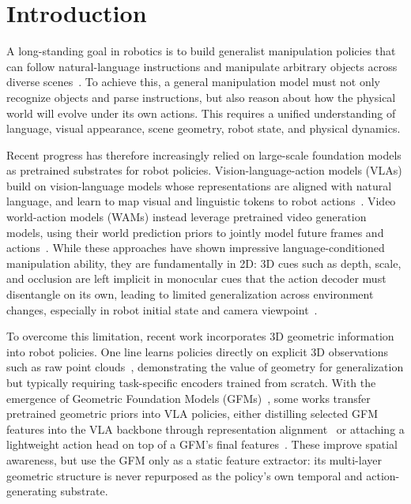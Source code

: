 \section{Introduction}
\label{sec:intro}
A long-standing goal in robotics is to build generalist manipulation policies that can follow natural-language instructions and manipulate arbitrary objects across diverse scenes~\citep{kim2024openvla, openvla_oft, kim2026cosmos, black2024pi_0}. To achieve this, a general manipulation model must not only recognize objects and parse instructions, but also reason about how the physical world will evolve under its own actions. This requires a unified understanding of language, visual appearance, scene geometry, robot state, and physical dynamics. 

Recent progress has therefore increasingly relied on large-scale foundation models as pretrained substrates for robot policies. Vision-language-action models (VLAs) build on vision-language models whose representations are aligned with natural language, and learn to map visual and linguistic tokens to robot actions~\cite{zitkovich2023rt,kim2024openvla,openvla_oft,black2024pi_0,pi05,pi0_fast}. Video world-action models (WAMs) instead leverage pretrained video generation models, using their world prediction priors to jointly model future frames and actions~\cite{kim2026cosmos,pai2025mimic}. While these approaches have shown impressive language-conditioned manipulation ability, they are fundamentally in 2D: 3D cues such as depth, scale, and occlusion are left implicit in monocular cues that the action decoder must disentangle on its own, leading to limited generalization across environment changes, especially in robot initial state and camera viewpoint~\cite{fei2025libero, wilcox2025adapt3r}. 

To overcome this limitation, recent work incorporates 3D geometric information into robot policies. One line learns policies directly on explicit 3D observations such as raw point clouds~\citep{ze20243d,huang2026pointworld}, demonstrating the value of geometry for generalization but typically requiring task-specific encoders trained from scratch. With the emergence of Geometric Foundation Models (GFMs)~\cite{lin2025depth,wang2025vggt,wang2026vggt}, some works transfer pretrained geometric priors into VLA policies, either distilling selected GFM features into the VLA backbone through representation alignment~\citep{yu2024representation,li2025spatial,sun2026rocket} or attaching a lightweight action head on top of a GFM's final features~\citep{qian2025gp3,ge2025vggt}. These improve spatial awareness, but use the GFM only as a static feature extractor: its multi-layer geometric structure is never repurposed as the policy's own temporal and action-generating substrate.  

